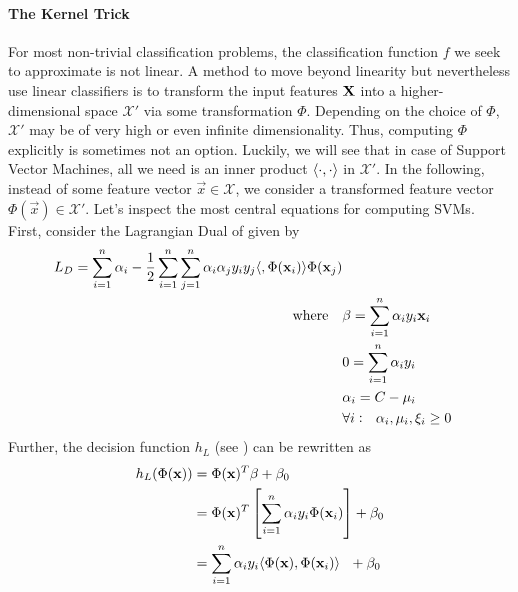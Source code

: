\documentclass[
	fontsize=10pt, %
	twoside=false, %
	secnumdepth=1, %
]{kaobook}
\begin{document}
\paragraph{The Kernel Trick} For most non-trivial classification problems, the
classification function $f$ we seek to approximate is not linear. A method to
move beyond linearity but nevertheless use linear classifiers is to
transform the input features $\mathbf{X}$ into a higher-dimensional space
$\mathcal{X}'$ via some transformation $\Phi$. Depending on the choice of
$\Phi$, $\mathcal{X'}$ may be of very high or even infinite dimensionality.
Thus, computing $\Phi$ explicitly is sometimes not an option. Luckily, we will
see that in case of Support Vector Machines, all we need is an inner product
$\langle \cdot, \cdot \rangle$ in $\mathcal{X}'$. In the following, instead of some
feature vector $\vec x \in \mathcal{X}$, we consider a transformed feature
vector $\Phi(\vec x) \in \mathcal{X} '$.
%
Let's inspect the most central equations for computing SVMs. First, consider the
Lagrangian Dual of  given by
\begin{align*}
  L_D = \sum_{i=1}^n \alpha_i - \frac{1}{2} \sum_{i=1}^n \sum_{j=1}^n \alpha_i \alpha_j y_i y_j \vec \inner{\Phi(\vec x_i)}{\Phi(\vec x_j)} \\
  \text{where~~~} & 
                 \beta = \sum_{i=1}^n \alpha_i y_i \vec x_i \\
  & 0 = \sum_{i=1}^n \alpha_i y_i \\
  & \alpha_i = C - \mu_i \\
  & \forall i:~~ \alpha_i, \mu_i, \xi_i \geq 0 \\
\end{align*}
Further, the decision function $h_L$ (see ) can be
rewritten as
\begin{align*}
  h_L(\Phi(\mathbf{x})) & = \Phi(\mathbf{x})^T \mathbf{\beta} + \beta_0 \\
              & = \Phi(\mathbf{x})^T \left[ \sum_{i=1}^n \alpha_i y_i \Phi(\mathbf{x}_i) \right] + \beta_0 \\
  &  = \sum_{i=1}^n \alpha_i y_i \langle \Phi(\mathbf{x}), \Phi(\mathbf{x}_i) \rangle ~~ + \beta_0
\end{align*}
\end{document}
